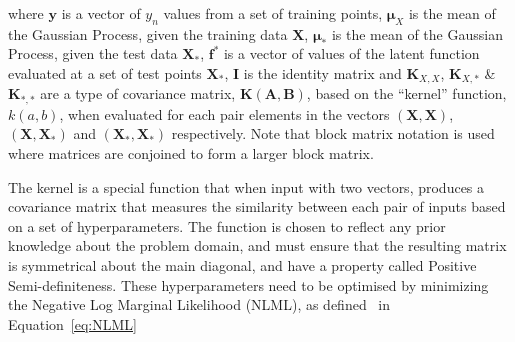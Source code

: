 \documentclass[12pt]{article}
\begin{document}


    where $\mathbf{y}$ is a vector of $y_n$ values from a set of training points, $\boldsymbol{\mu}_X$ is the mean of the Gaussian Process, given the training data $\mathbf{X}$, $\boldsymbol{\mu}_*$ is the mean of the Gaussian Process, given the test data $\mathbf{X}_*$, $\mathbf{f}^*$ is a vector of values of the latent function evaluated at a set of test points $\mathbf{X}_*$, $\mathbf{I}$ is the identity matrix and $\mathbf{K}_{X,X}$, $\mathbf{K}_{X,*}$ \& $\mathbf{K}_{*,*}$ are a type of covariance matrix, $\mathbf{K}(\mathbf{A},\mathbf{B})$, based on the ``kernel'' function, $k(a,b)$, when evaluated for each pair elements in the vectors $(\mathbf{X},\mathbf{X})$, $(\mathbf{X},\mathbf{X}_*)$ and $(\mathbf{X}_*,\mathbf{X}_*)$ respectively.
    Note that block matrix notation is used where matrices are conjoined to form a larger block matrix. 

    The kernel is a special function that when input with two vectors, produces a covariance matrix that measures the similarity between each pair of inputs based on a set of hyperparameters.
    The function is chosen to reflect any prior knowledge about the problem domain, and must ensure that the resulting matrix is symmetrical about the main diagonal, and have a property called Positive Semi-definiteness.
    These hyperparameters need to be optimised by minimizing the Negative Log Marginal Likelihood (NLML), as defined~\cite{murphy2023probabilistic} in Equation~\ref{eq:NLML}
\end{document}
